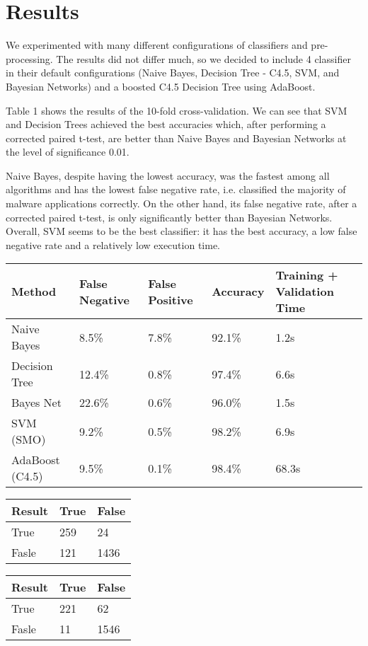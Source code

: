\section{Results}
We experimented with many different configurations of classifiers and pre-processing. The results did not differ much, so we decided to include 4 classifier in their default configurations (Naive Bayes, Decision Tree - C4.5, SVM, and Bayesian Networks) and a boosted C4.5 Decision Tree using AdaBoost.

Table 1 shows the results of the 10-fold cross-validation. We can see that SVM and Decision Trees achieved the best accuracies which, after performing a corrected paired t-test, are better than Naive Bayes and Bayesian Networks at the level of significance 0.01.

Naive Bayes, despite having the lowest accuracy, was the fastest among all algorithms and has the lowest false negative rate, i.e. classified the majority of malware applications correctly. On the other hand, its false negative rate, after a corrected paired t-test, is only significantly better than Bayesian Networks. Overall, SVM seems to be the best classifier: it has the best accuracy, a low false negative rate and a relatively low execution time.
\begin{tabular}{|l|l l l l|}
\hline
Method & False Negative & False Positive & Accuracy & Training + Validation Time \\
\hline
Naive Bayes & 8.5\% & 7.8\% & 92.1\% & 1.2s \\
Decision Tree & 12.4\% & 0.8\% & 97.4\% & 6.6s \\
Bayes Net & 22.6\% & 0.6\% & 96.0\% & 1.5s \\
SVM (SMO) & 9.2\% & 0.5\% & 98.2\% & 6.9s \\
AdaBoost (C4.5) & 9.5\% & 0.1\% & 98.4\% & 68.3s \\
\hline
\end{tabular}
\begin{tabular}{|l|l l|}
\hline
Result & True & False \\
\hline
True & 259 & 24 \\
Fasle & 121 & 1436 \\
\hline
\end{tabular}
\begin{tabular}{|l|l l|}
\hline
Result & True & False \\
\hline
True & 221 & 62 \\
Fasle & 11 & 1546 \\
\hline
\end{tabular}
